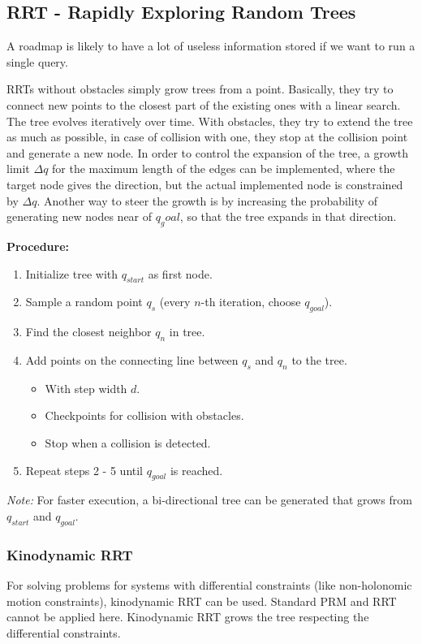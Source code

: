 \begin{multicols*}{2}
\subsection{RRT - Rapidly Exploring Random Trees}
A roadmap is likely to have a lot of useless information stored if we want to run a single query.

RRTs without obstacles simply grow trees from a point.
Basically, they try to connect new points to the closest part of the existing ones with a linear search.
The tree evolves iteratively over time.
With obstacles, they try to extend the tree as much as possible, in case of collision with one, they stop at the collision point and generate a new node.
In order to control the expansion of the tree, a growth limit $\Delta q$ for the maximum length of the edges can be implemented, where the target node gives the direction, but the actual implemented node is constrained by $\Delta q$.
Another way to steer the growth is by increasing the probability of generating new nodes near of $q_goal$, so that the tree expands in that direction.

\textbf{Procedure:}
\begin{enumerate}
	\item Initialize tree with $q_{start}$ as first node.
	\item Sample a random point $q_s$ (every $n$-th iteration, choose $q_{goal}$).
	\item Find the closest neighbor $q_n$ in tree.
	\item Add points on the connecting line between $q_s$ and $q_n$ to the tree.
	\begin{itemize}
		\item With step width $d$.
		\item Checkpoints for collision with obstacles.
		\item Stop when a collision is detected.
	\end{itemize}
	\item Repeat steps 2 - 5 until $q_{goal}$ is reached.
\end{enumerate}
\textit{Note:} For faster execution, a bi-directional tree can be
generated that grows from $q_{start}$ and $q_{goal}$.

\subsubsection{Kinodynamic RRT}
For solving problems for systems with differential constraints (like non-holonomic motion constraints), kinodynamic RRT can be used.
Standard PRM and RRT cannot be applied here.
Kinodynamic RRT grows the tree respecting the differential constraints.


\end{multicols*}
